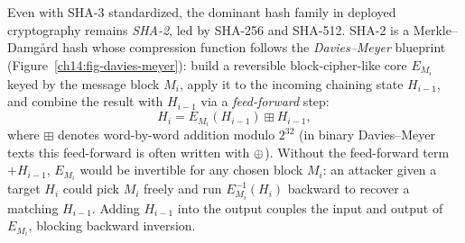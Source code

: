 Even with SHA-3 standardized, the dominant hash family in deployed cryptography remains \emph{SHA-2}, led by SHA-256 and SHA-512. SHA-2 is a Merkle--Damg\aa{}rd hash whose compression function follows the \emph{Davies--Meyer} blueprint (Figure~\ref{ch14:fig-davies-meyer}): build a reversible block-cipher-like core $E_{M_i}$ keyed by the message block $M_i$, apply it to the incoming chaining state $H_{i-1}$, and combine the result with $H_{i-1}$ via a \emph{feed-forward} step:
\[
  H_i = E_{M_i}(H_{i-1}) \boxplus H_{i-1},
\]
where $\boxplus$ denotes word-by-word addition modulo $2^{32}$ (in binary Davies--Meyer texts this feed-forward is often written with $\oplus$). Without the feed-forward term $+ H_{i-1}$, $E_{M_i}$ would be invertible for any chosen block $M_i$: an attacker given a target $H_i$ could pick $M_i$ freely and run $E_{M_i}^{-1}(H_i)$ backward to recover a matching $H_{i-1}$. Adding $H_{i-1}$ into the output couples the input and output of $E_{M_i}$, blocking backward inversion.

